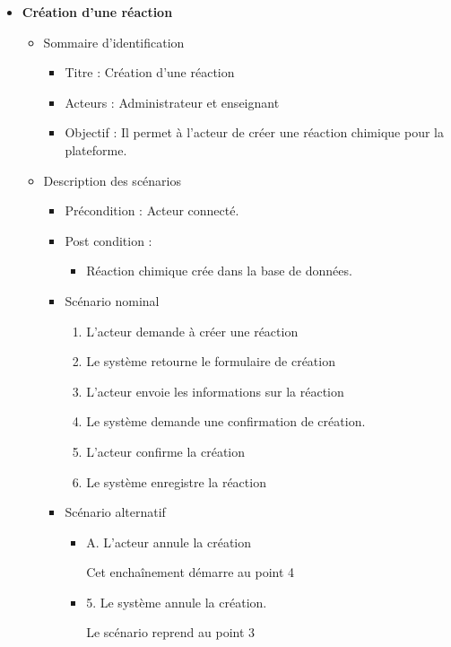 \begin{itemize}
	\item \textbf{Création d’une réaction}
	\begin{itemize}
		\item Sommaire d’identification
		\begin{itemize}
			\item Titre : Création d’une réaction 
			\item Acteurs : Administrateur et enseignant 
			\item Objectif : Il permet à l’acteur de créer une réaction chimique pour la plateforme.
		\end{itemize}
		\item Description des scénarios
		\begin{itemize}
			\item Précondition : Acteur connecté.
			\item Post condition :
			\begin{itemize}
				\item Réaction chimique crée dans la base de données. 
			\end{itemize}
			\item Scénario nominal 
			\begin{enumerate}
				\item L’acteur demande à créer une réaction 
				\item Le système retourne le formulaire de création
				\item L’acteur envoie les informations sur la réaction 
				\item Le système demande une confirmation de création. 
				\item L’acteur confirme la création 
				\item Le système enregistre la réaction
			\end{enumerate}
			\item Scénario alternatif
			\begin{itemize}
				\item A. L’acteur annule la création
				
				Cet enchaînement démarre au point 4

				\item 5. Le système annule la création.
				
				Le scénario reprend au point 3 
			\end{itemize}
		\end{itemize}
	\end{itemize}


\end{itemize}

